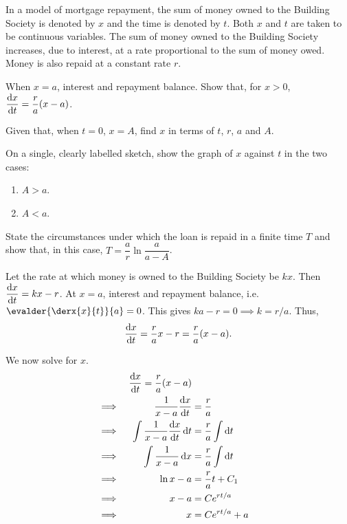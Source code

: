 \documentclass{echw}
\begin{document}

    \problem{}
        In a model of mortgage repayment, the sum of money owned to the Building Society is denoted by $x$ and the time is denoted by $t$. Both $x$ and $t$ are taken to be continuous variables. The sum of money owned to the Building Society increases, due to interest, at a rate proportional to the sum of money owed. Money is also repaid at a constant rate $r$.

        When $x = a$, interest and repayment balance. Show that, for $x > 0$, $\dfrac{\mathrm{d} x}{\mathrm{d} t} = \dfrac{r}{a} (x - a)$.

        Given that, when $t = 0$, $x = A$, find $x$ in terms of $t$, $r$, $a$ and $A$.

        On a single, clearly labelled sketch, show the graph of $x$ against $t$ in the two cases:
        \begin{enumerate}
            \item $A > a$.
            \item $A < a$.
        \end{enumerate}

        State the circumstances under which the loan is repaid in a finite time $T$ and show that, in this case, $T = \dfrac{a}{r} \ln \dfrac{a}{a - A}$.
    
    \solution
        Let the rate at which money is owned to the Building Society be $kx$. Then $\dfrac{\mathrm{d} x}{\mathrm{d} t} = kx - r$. At $x = a$, interest and repayment balance, i.e. $\evalder{\derx{x}{t}}{a} = 0$. This gives $ka - r = 0 \implies k = r/a$. Thus, \[\dfrac{\mathrm{d} x}{\mathrm{d} t} = \dfrac{r}{a} x - r = \dfrac{r}{a} (x - a).\]

        We now solve for $x$.
        \begin{alignat*}{2}
            &&\dfrac{\mathrm{d} x}{\mathrm{d} t} = \dfrac{r}{a} (x - a)\\
            \implies&&\dfrac{1}{x-a} \dfrac{\mathrm{d} x}{\mathrm{d} t} &= \dfrac{r}{a}\\
            \implies&&\int \dfrac{1}{x-a} \dfrac{\mathrm{d} x}{\mathrm{d} t} \mathop{\mathrm{d}t} &= \dfrac{r}{a} \int \mathop{\mathrm{d}t}\\
            \implies&&\int \dfrac{1}{x-a} \mathop{\mathrm{d}x} &= \dfrac{r}{a} \int \mathop{\mathrm{d}t}\\
            \implies&& \ln{x-a} &= \dfrac{r}{a} t + C_1\\
            \implies&& x-a &= Ce^{rt/a}\\
            \implies&& x &= Ce^{rt/a} + a
        \end{alignat*}
\end{document}
